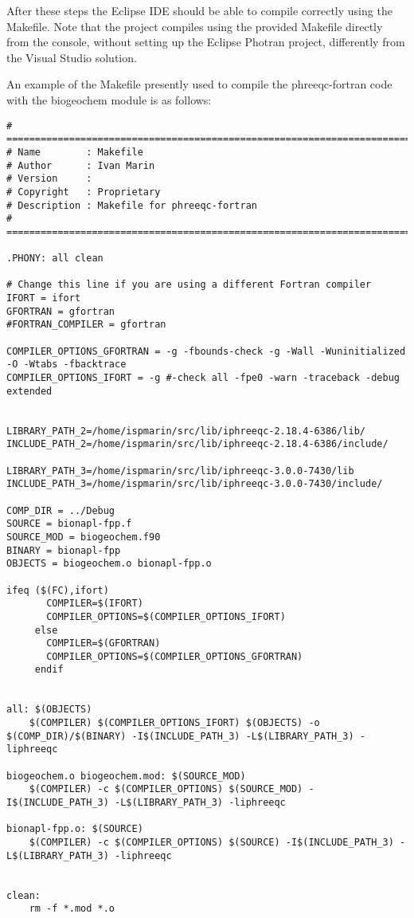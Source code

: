 \documentclass[12pt,a4paper,twoside]{report}
\begin{document}
After these steps the Eclipse IDE should be able to compile correctly using the Makefile. Note that the project compiles using the provided Makefile directly from the console, without setting up the Eclipse Photran project, differently from the Visual Studio solution.

An example of the Makefile presently used to compile the phreeqc-fortran code with the biogeochem module is as follows:

\begin{lstlisting}[style=Bash]
# ============================================================================
# Name        : Makefile
# Author      : Ivan Marin
# Version     :
# Copyright   : Proprietary 
# Description : Makefile for phreeqc-fortran
# ============================================================================

.PHONY: all clean

# Change this line if you are using a different Fortran compiler
IFORT = ifort
GFORTRAN = gfortran
#FORTRAN_COMPILER = gfortran

COMPILER_OPTIONS_GFORTRAN = -g -fbounds-check -g -Wall -Wuninitialized -O -Wtabs -fbacktrace 
COMPILER_OPTIONS_IFORT = -g #-check all -fpe0 -warn -traceback -debug extended 


LIBRARY_PATH_2=/home/ispmarin/src/lib/iphreeqc-2.18.4-6386/lib/
INCLUDE_PATH_2=/home/ispmarin/src/lib/iphreeqc-2.18.4-6386/include/

LIBRARY_PATH_3=/home/ispmarin/src/lib/iphreeqc-3.0.0-7430/lib
INCLUDE_PATH_3=/home/ispmarin/src/lib/iphreeqc-3.0.0-7430/include/

COMP_DIR = ../Debug
SOURCE = bionapl-fpp.f
SOURCE_MOD = biogeochem.f90
BINARY = bionapl-fpp
OBJECTS = biogeochem.o bionapl-fpp.o

ifeq ($(FC),ifort)
       COMPILER=$(IFORT)
	   COMPILER_OPTIONS=$(COMPILER_OPTIONS_IFORT)
     else
	   COMPILER=$(GFORTRAN)
       COMPILER_OPTIONS=$(COMPILER_OPTIONS_GFORTRAN)
     endif


all: $(OBJECTS) 
	$(COMPILER) $(COMPILER_OPTIONS_IFORT) $(OBJECTS) -o $(COMP_DIR)/$(BINARY) -I$(INCLUDE_PATH_3) -L$(LIBRARY_PATH_3) -liphreeqc

biogeochem.o biogeochem.mod: $(SOURCE_MOD) 
	$(COMPILER) -c $(COMPILER_OPTIONS) $(SOURCE_MOD) -I$(INCLUDE_PATH_3) -L$(LIBRARY_PATH_3) -liphreeqc

bionapl-fpp.o: $(SOURCE)
	$(COMPILER) -c $(COMPILER_OPTIONS) $(SOURCE) -I$(INCLUDE_PATH_3) -L$(LIBRARY_PATH_3) -liphreeqc


clean:
	rm -f *.mod *.o 

\end{lstlisting}
\end{document}
